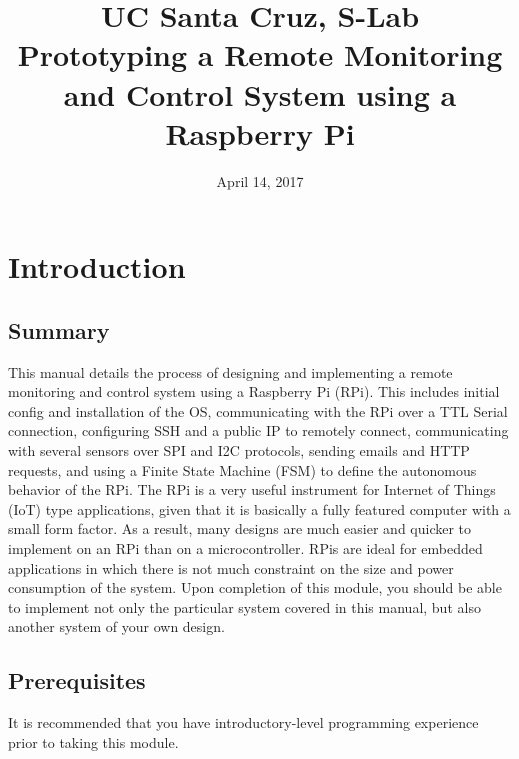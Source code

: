 \documentclass{article}
\title{
  UC Santa Cruz, S-Lab \\
  \textbf{Prototyping a Remote Monitoring and Control System using a Raspberry Pi} \\
}
\date{April 14, 2017}
\begin{document}
\maketitle

\tableofcontents

\section{Introduction}
  \subsection{Summary}
  This manual details the process of designing and implementing a remote monitoring and control system using a Raspberry Pi (RPi). This includes initial config and installation of the OS, communicating with the RPi over a TTL Serial connection, configuring SSH and a public IP to remotely connect, communicating with several sensors over SPI and I2C protocols, sending emails and HTTP requests, and using a Finite State Machine (FSM) to define the autonomous behavior of the RPi.
  The RPi is a very useful instrument for Internet of Things (IoT) type applications, given that it is basically a fully featured computer with a small form factor. As a result, many designs are much easier and quicker to implement on an RPi than on a microcontroller. RPis are ideal for embedded applications in which there is not much constraint on the size and power consumption of the system. Upon completion of this module, you should be able to implement not only the particular system covered in this manual, but also another system of your own design.
  \subsection{Prerequisites}
  It is recommended that you have introductory-level programming experience prior to taking this module.
\end{document}
